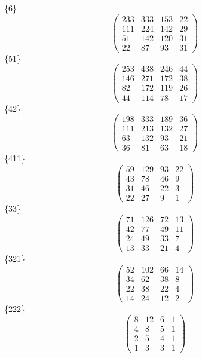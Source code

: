 \documentclass[12pt,reqno]{amsart}
\begin{document}
\Large
\{6\}                             $$ \begin{pmatrix} 
                       233 & 333 & 153 & 22 \\[6pt]
                       111 & 224 & 142 & 29 \\[6pt]
                        51 & 142 & 120 & 31 \\[6pt]
                           22 & 87 & 93 & 31
                              \end{pmatrix} $$ 
\{51\}                             $$ \begin{pmatrix} 
                       253 & 438 & 246 & 44 \\[6pt]
                       146 & 271 & 172 & 38 \\[6pt]
                        82 & 172 & 119 & 26 \\[6pt]
                          44 & 114 & 78 & 17
                              \end{pmatrix} $$ 
\{42\}                             $$ \begin{pmatrix} 
                       198 & 333 & 189 & 36 \\[6pt]
                       111 & 213 & 132 & 27 \\[6pt]
                        63 & 132 & 93 & 21 \\[6pt]
                           36 & 81 & 63 & 18
                              \end{pmatrix} $$ 
\{411\}                             $$ \begin{pmatrix} 
                        59 & 129 & 93 & 22 \\[6pt]
                         43 & 78 & 46 & 9 \\[6pt]
                         31 & 46 & 22 & 3 \\[6pt]
                            22 & 27 & 9 & 1
                              \end{pmatrix} $$ 
\{33\}                             $$ \begin{pmatrix} 
                        71 & 126 & 72 & 13 \\[6pt]
                         42 & 77 & 49 & 11 \\[6pt]
                         24 & 49 & 33 & 7 \\[6pt]
                           13 & 33 & 21 & 4
                              \end{pmatrix} $$ 
\{321\}                             $$ \begin{pmatrix} 
                        52 & 102 & 66 & 14 \\[6pt]
                         34 & 62 & 38 & 8 \\[6pt]
                         22 & 38 & 22 & 4 \\[6pt]
                           14 & 24 & 12 & 2
                              \end{pmatrix} $$ 
\{222\}                             $$ \begin{pmatrix} 
                          8 & 12 & 6 & 1 \\[6pt]
                           4 & 8 & 5 & 1 \\[6pt]
                           2 & 5 & 4 & 1 \\[6pt]
                             1 & 3 & 3 & 1
                              \end{pmatrix} $$ 
\end{document}
